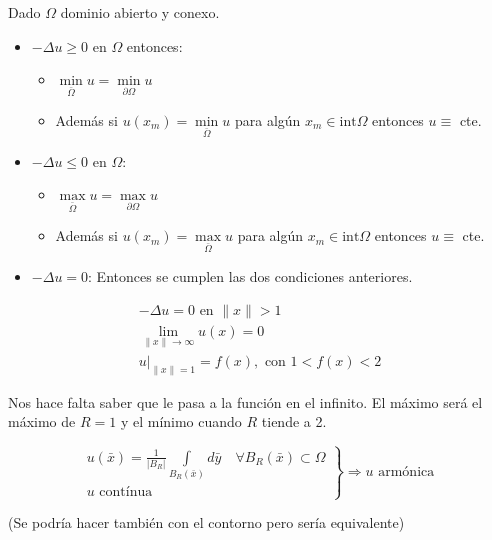 		\begin{theorem}  \label{prop:MaximoFuerte}

			Dado $\Omega$ dominio abierto y conexo.

			\begin{itemize}
				\item $-\Delta u \geq 0$ en $\Omega$ entonces:
				\begin{itemize}
					\item $\min\limits_{\bar{\Omega}} u = \min\limits_{\partial \Omega} u$
					\item Además si $u(x_m) = \min\limits_{\bar{\Omega}} u$ para algún $x_m \in \text{int} \Omega$ entonces $u \equiv$ cte.
				\end{itemize}

				\item $-\Delta u \leq 0$ en $\Omega$:
				\begin{itemize}
					\item $\max\limits_{\bar{\Omega}} u = \max\limits_{\partial \Omega} u$
					\item Además si $u(x_m) = \max\limits_{\bar{\Omega}} u$ para algún $x_m \in \text{int} \Omega$ entonces $u \equiv$ cte.
				\end{itemize}

				\item $-\Delta u = 0$: Entonces se cumplen las dos condiciones anteriores.

			\end{itemize}

		\end{theorem}

		\begin{example}

			\[\begin{array}{l}
				-\Delta u = 0 \text{ en } \|x\| > 1 \\
				\lim\limits_{\|x\| \to \infty} u(x) = 0 \\
				u|_{\|x\| = 1} = f(x), \text{ con } 1 < f(x) < 2
			\end{array}\]

			Nos hace falta saber que le pasa a la función en el infinito. El máximo será el máximo de $R=1$ y el mínimo cuando $R$ tiende a 2.

		\end{example}


		\begin{theorem}
			\[ \left. \begin{array}{l}
				u(\bar{x}) = \frac{1}{|B_R|} \int\limits_{B_R(\bar{x})} d\bar{y} \quad \forall B_R(\bar{x}) \subset \Omega \\
				u \text{ contínua }
			\end{array} \right\} \Rightarrow u \text{ armónica } \]

			(Se podría hacer también con el contorno pero sería equivalente)

		\end{theorem}

